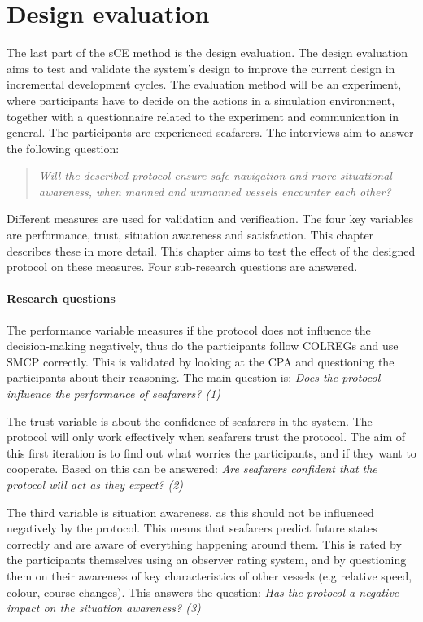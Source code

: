 \chapter{Design evaluation}
\label{ch:evaluation}
The last part of the sCE method is the design evaluation. The design evaluation aims to test and validate the system’s design to improve the current design in incremental development cycles. 
The evaluation method will be an experiment, where participants have to decide on the actions in a simulation environment, together with a questionnaire related to the experiment and communication in general. The participants are experienced seafarers. The interviews aim to answer the following question:
\begin{quotation}
	\emph{Will the described protocol ensure safe navigation and more situational awareness, when manned and unmanned vessels encounter each other?}
\end{quotation}
Different measures are used for validation and verification. The four key variables are performance, trust, situation awareness and satisfaction. This chapter describes these in more detail. This chapter aims to test the effect of the designed protocol on these measures. Four sub-research questions are answered.

\subsubsection{Research questions}
The performance variable measures if the protocol does not influence the decision-making negatively, thus do the participants follow COLREGs and use SMCP correctly. This is validated by looking at the \ac{CPA} and questioning the participants about their reasoning. The main question is: \emph{Does the protocol influence the performance of seafarers? (1)}

The trust variable is about the confidence of seafarers in the system. The protocol will only work effectively when seafarers trust the protocol. The aim of this first iteration is to find out what worries the participants, and if they want to cooperate. Based on this can be answered: \emph{Are seafarers confident that the protocol will act as they expect? (2)}

The third variable is situation awareness, as this should not be influenced negatively by the protocol. This means that seafarers predict future states correctly and are aware of everything happening around them. This is rated by the participants themselves using an observer rating system, and by questioning them on their awareness of key characteristics of other vessels (e.g relative speed, colour, course changes). This answers the question: \emph{Has the protocol a negative impact on the situation awareness? (3)}

